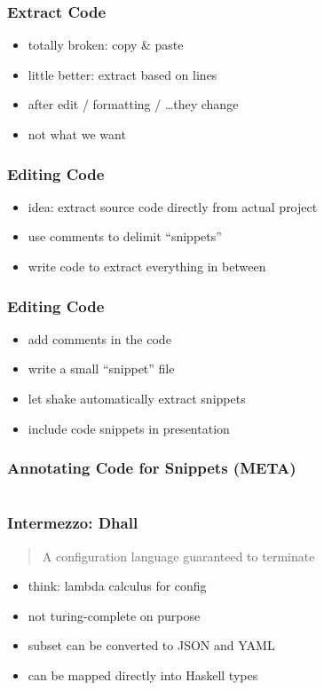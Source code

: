\documentclass{beamer}
\begin{document}
\begin{frame}[fragile]
  \frametitle{Extract Code}
  \begin{itemize}
  \item totally broken: copy \& paste
  \item little better: extract based on lines
  \item after edit / formatting / \ldots they change
  \item not what we want
  \end{itemize}
\end{frame}

\begin{frame}
  \frametitle{Editing Code}
  \begin{itemize}
  \item idea: extract source code directly from actual project
  \item use comments to delimit ``snippets''
  \item write code to extract everything in between
  \end{itemize}
\end{frame}

\begin{frame}
  \frametitle{Editing Code}
  \begin{itemize}
  \item add comments in the code
  \item write a small ``snippet'' file
  \item let shake automatically extract snippets
  \item include code snippets in presentation
  \end{itemize}
\end{frame}

\begin{frame}
  \frametitle{Annotating Code for Snippets (META)}
  \begin{center}
    \inputminted[autogobble]{haskell}{snippets/outer-pdf-rule.hs}
  \end{center}
\end{frame}

\begin{frame}
  \frametitle{Intermezzo: Dhall}
  \begin{quote}
    A configuration language guaranteed to terminate
  \end{quote}
  \begin{itemize}
  \item think: lambda calculus for config
  \item not turing-complete on purpose
  \item subset can be converted to JSON and YAML
  \item can be mapped directly into Haskell types
  \end{itemize}
\end{frame}
\end{document}
